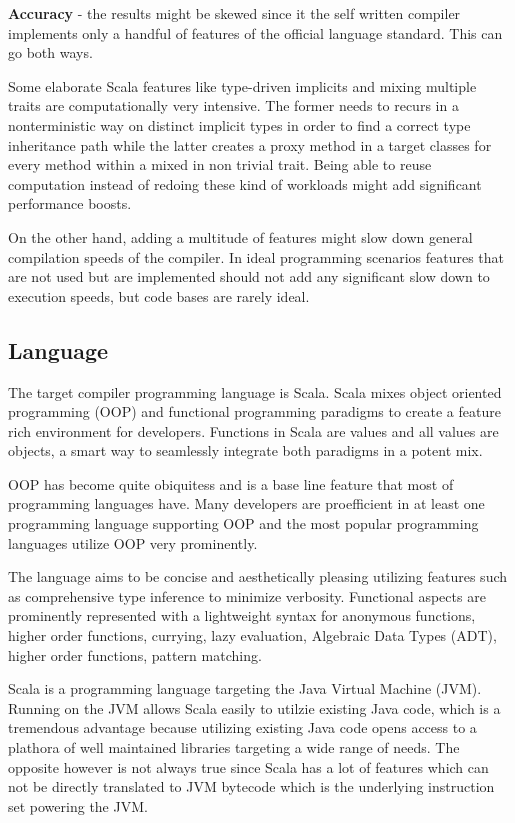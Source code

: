 \documentclass{VUMIFPSbakalaurinis}
\begin{document}
\textbf{Accuracy} - the results might be skewed since it the self written compiler implements only a handful of features of the official language standard.
This can go both ways.

Some elaborate Scala features like type-driven implicits and mixing multiple traits are computationally very intensive.
The former needs to recurs in a nonterministic way on distinct implicit types in order to find a correct type inheritance path while the latter creates a proxy method in a target classes for every method within a mixed in non trivial trait.
Being able to reuse computation instead of redoing these kind of workloads might add significant performance boosts.

On the other hand, adding a multitude of features might slow down general compilation speeds of the compiler.
In ideal programming scenarios features that are not used but are implemented should not add any significant slow down to execution speeds, but code bases are rarely ideal.

\subsection{Language}
The target compiler programming language is Scala.
Scala mixes object oriented programming (OOP)  and functional programming paradigms to create a feature rich environment for developers.
Functions in Scala are values and all values are objects, a smart way to seamlessly integrate both paradigms in a potent mix.

OOP has become quite obiquitess and is a base line feature that most of programming languages have.
Many developers are proefficient in at least one programming language supporting OOP and the most popular programming languages utilize OOP very prominently.

The language aims to be concise and aesthetically pleasing utilizing features such as comprehensive type inference to minimize verbosity.
Functional aspects are prominently represented with a lightweight syntax for anonymous functions, higher order functions, currying, lazy evaluation, Algebraic Data Types (ADT), higher order functions, pattern matching.

Scala is a programming language targeting the Java Virtual Machine (JVM).
Running on the JVM allows Scala easily to utilzie existing Java code, which is a tremendous advantage because utilizing existing Java code opens access to a plathora of well maintained libraries targeting a wide range of needs.
The opposite however is not always true since Scala has a lot of features which can not be directly translated to JVM bytecode which is the underlying instruction set powering the JVM.
\end{document}
